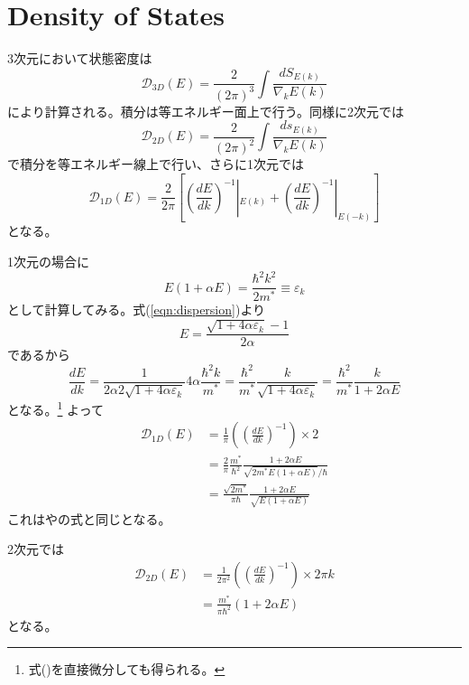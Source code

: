 \documentclass[11pt,uplatex,a4paper]{jsarticle}
\def\d#1#2{\frac{d #1}{d #2}}
\def\Ene{\varepsilon}
\begin{document}
\section{Density of States}
3次元において状態密度は
\begin{equation}
\mathcal{D}_{3D}(E) = \frac{2}{(2 \pi)^3} \int \frac{dS_{E(k)}}{\nabla_k E(k)}
\end{equation}
により計算される\cite{kittel}。積分は等エネルギー面上で行う。同様に2次元では
\begin{equation}
\mathcal{D}_{2D}(E) = \frac{2}{(2 \pi)^2} \int \frac{ds_{E(k)}}{\nabla_k E(k)}
\end{equation}
で積分を等エネルギー線上で行い、さらに1次元では
\begin{equation}
 \mathcal{D}_{1D}(E) = \frac{2}{2 \pi} [
  (\d{E}{k})^{-1}|_{E(k)}
  +(\d{E}{k})^{-1}|_{E(-k)}
  ]
\end{equation}
となる。

1次元の場合に
\begin{equation}
 E(1+\alpha E) = \frac{\hbar^2 k^2}{2 m^*}\equiv \Ene_k
  \label{eqn:dispersion}
\end{equation}
として計算してみる。式(\ref{eqn:dispersion})より
\begin{equation}
 E=\frac{\sqrt{1+4\alpha \Ene_k}-1}{2\alpha}
\end{equation}
であるから
\begin{equation}
 \d{E}{k} = \frac{1}{2\alpha 2 \sqrt{1+4\alpha \Ene_k}} 4 \alpha \frac{\hbar^2 k }{m^*} =
  \frac{\hbar^2}{m^*} \frac{k}{\sqrt{1+4\alpha \Ene_k}}
  = \frac{\hbar^2}{m^*} \frac{k}{1+2\alpha E}
\end{equation}
となる。\footnote{式(\protect{\ref{eqn:dispersion}})を直接微分しても得られる。}
よって
\begin{subequations}
\begin{align}
 \mathcal{D}_{1D}(E)
 &= \frac{1}{\pi}((\d{E}{k})^{-1}) \times 2 \\
 & = \frac{2}{\pi} \frac{m^*}{\hbar^2} \frac{1+2\alpha E}{\sqrt{2 m^* E(1+\alpha E)}/\hbar} \\
 &= \frac{\sqrt{2 m^*}}{\pi \hbar} 
 \frac{1+2 \alpha E}{\sqrt{E(1+\alpha E)}}
 \end{align}
\end{subequations}
これは\cite{Godoy}や\cite{Lind}の式と同じとなる。

2次元では
\begin{subequations}
\begin{align}
 \mathcal{D}_{2D}(E)
 & = \frac{1}{2\pi^2}((\d{E}{k})^{-1}) \times 2 \pi k \\
 & = \frac{m^*}{\pi\hbar^2} (1+2 \alpha E)
\end{align}
\end{subequations}
となる。
\end{document}
